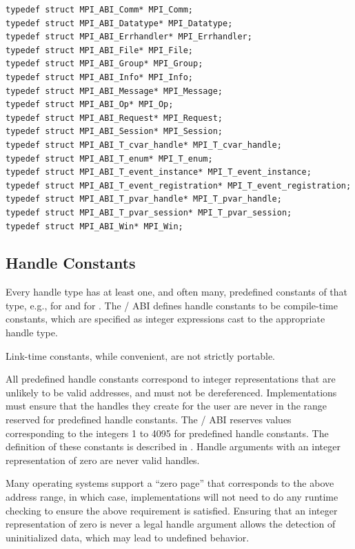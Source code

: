 \begin{lstlisting}[language={[MPI]C}]
typedef struct MPI_ABI_Comm* MPI_Comm;
typedef struct MPI_ABI_Datatype* MPI_Datatype;
typedef struct MPI_ABI_Errhandler* MPI_Errhandler;
typedef struct MPI_ABI_File* MPI_File;
typedef struct MPI_ABI_Group* MPI_Group;
typedef struct MPI_ABI_Info* MPI_Info;
typedef struct MPI_ABI_Message* MPI_Message;
typedef struct MPI_ABI_Op* MPI_Op;
typedef struct MPI_ABI_Request* MPI_Request;
typedef struct MPI_ABI_Session* MPI_Session;
typedef struct MPI_ABI_T_cvar_handle* MPI_T_cvar_handle;
typedef struct MPI_ABI_T_enum* MPI_T_enum;
typedef struct MPI_ABI_T_event_instance* MPI_T_event_instance;
typedef struct MPI_ABI_T_event_registration* MPI_T_event_registration;
typedef struct MPI_ABI_T_pvar_handle* MPI_T_pvar_handle;
typedef struct MPI_ABI_T_pvar_session* MPI_T_pvar_session;
typedef struct MPI_ABI_Win* MPI_Win;
\end{lstlisting}

\subsection{Handle Constants}

Every handle type has at least one, and often many, 
predefined constants of that type, e.g.,
 for  and 
 for .
The \MPI/ ABI defines handle constants to be compile-time constants,
which are specified as integer expressions cast to the appropriate handle type.

\begin{rationale}
Link-time constants, while convenient, are not strictly portable.
\end{rationale}

All predefined handle constants correspond to integer representations 
that are unlikely to be valid addresses, and must not be dereferenced. 
Implementations must ensure that the handles they create for the user 
are never in the range reserved for predefined handle constants. 
The \MPI/ ABI reserves values corresponding to
the integers 1 to 4095 for predefined handle constants.
The definition of these constants is described in .
Handle arguments with an integer representation of zero are never valid handles.

\begin{rationale}
Many operating systems support a ``zero page'' that corresponds 
to the above address range, in which case, implementations 
will not need to do any runtime checking to ensure the above requirement is satisfied.
Ensuring that an integer representation of zero is never a legal handle
argument allows the detection of uninitialized data, which may lead to
undefined behavior.
\end{rationale}

